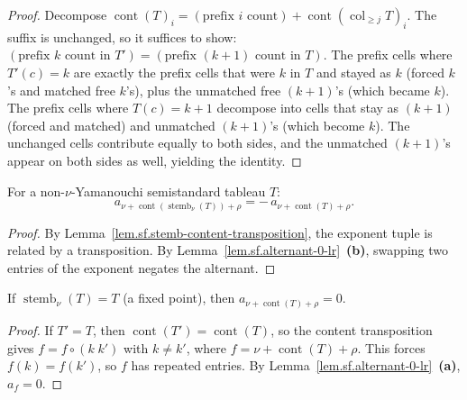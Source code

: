 \begin{proof}
\leanok
Decompose $\operatorname{cont}(T)_i = (\text{prefix } i \text{ count}) + \operatorname{cont}(\operatorname{col}_{\geq j} T)_i$.
The suffix is unchanged, so it suffices to show: $(\text{prefix } k \text{ count in } T') = (\text{prefix } (k{+}1) \text{ count in } T)$.
The prefix cells where $T'(c) = k$ are exactly the prefix cells that were $k$ in $T$
and stayed as $k$ (forced $k$'s and matched free $k$'s), plus the unmatched free
$(k{+}1)$'s (which became $k$).
The prefix cells where $T(c) = k{+}1$ decompose into cells that stay as $(k{+}1)$
(forced and matched) and unmatched $(k{+}1)$'s (which become $k$).
The unchanged cells contribute equally to both sides, and the
unmatched $(k{+}1)$'s appear on both sides as well, yielding the identity.
\end{proof}

\begin{lemma}
\label{lem.sf.stemb-sign-reversing}
\leanhelper
\leanok
For a non-$\nu$-Yamanouchi semistandard tableau $T$:
\[
  a_{\nu + \operatorname{cont}(\operatorname{stemb}_\nu(T)) + \rho}
  = -\,a_{\nu + \operatorname{cont}(T) + \rho}.
\]
\end{lemma}

\begin{proof}
\leanok
By Lemma~\ref{lem.sf.stemb-content-transposition}, the exponent tuple is
related by a transposition. By Lemma~\ref{lem.sf.alternant-0-lr}~\textbf{(b)},
swapping two entries of the exponent negates the alternant.
\end{proof}

\begin{lemma}
\label{lem.sf.stemb-fixed-point-zero}
\leanhelper
\leanok
If $\operatorname{stemb}_\nu(T) = T$ (a fixed point), then
$a_{\nu + \operatorname{cont}(T) + \rho} = 0$.
\end{lemma}

\begin{proof}
\leanok
If $T' = T$, then $\operatorname{cont}(T') = \operatorname{cont}(T)$, so the
content transposition gives $f = f \circ (k\;k')$ with $k \neq k'$, where
$f = \nu + \operatorname{cont}(T) + \rho$. This forces $f(k) = f(k')$, so
$f$ has repeated entries. By Lemma~\ref{lem.sf.alternant-0-lr}~\textbf{(a)},
$a_f = 0$.
\end{proof}

